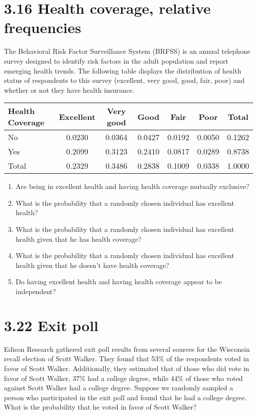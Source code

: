 \documentclass{article}
\begin{document}
\section*{3.16 Health coverage, relative frequencies}
The Behavioral Risk Factor Surveillance System (BRFSS) is an annual telephone survey designed to identify risk factors in the adult population and report emerging health trends. The following table displays the distribution of health status of respondents to this survey (excellent, very good, good, fair, poor) and whether or not they have health insurance.

\begin{table}[H]
\centering
\settowidth{}
\setlength\extrarowheight{2pt}
\begin{tabulary}{1.0\linewidth}{|L|C|C|C|C|C|C|}

\hline
\textbf{Health Coverage} & \textbf{Excellent} & \textbf{Very good} & \textbf{Good} & \textbf{Fair} & \textbf{Poor} & \textbf{Total} \\
\hline
No & 0.0230 & 0.0364 & 0.0427 & 0.0192 & 0.0050 & 0.1262 \\
Yes & 0.2099 & 0.3123 & 0.2410 & 0.0817 & 0.0289 & 0.8738 \\
\hline
Total & 0.2329 & 0.3486 & 0.2838 & 0.1009 & 0.0338 & 1.0000 \\
\hline
\end{tabulary}
\end{table}

\begin{enumerate}
    \item[(a)] Are being in excellent health and having health coverage mutually exclusive?
    \item[(b)] What is the probability that a randomly chosen individual has excellent health?
    \item[(c)] What is the probability that a randomly chosen individual has excellent health given that he has health coverage?
    \item[(d)] What is the probability that a randomly chosen individual has excellent health given that he doesn’t have health coverage?
    \item[(e)] Do having excellent health and having health coverage appear to be independent?
\end{enumerate}

\section*{3.22 Exit poll}
Edison Research gathered exit poll results from several sources for the Wisconsin recall election of Scott Walker. They found that 53\% of the respondents voted in favor of Scott Walker. Additionally, they estimated that of those who did vote in favor of Scott Walker, 37\% had a college degree, while 44\% of those who voted against Scott Walker had a college degree. Suppose we randomly sampled a person who participated in the exit poll and found that he had a college degree. What is the probability that he voted in favor of Scott Walker?
\end{document}
